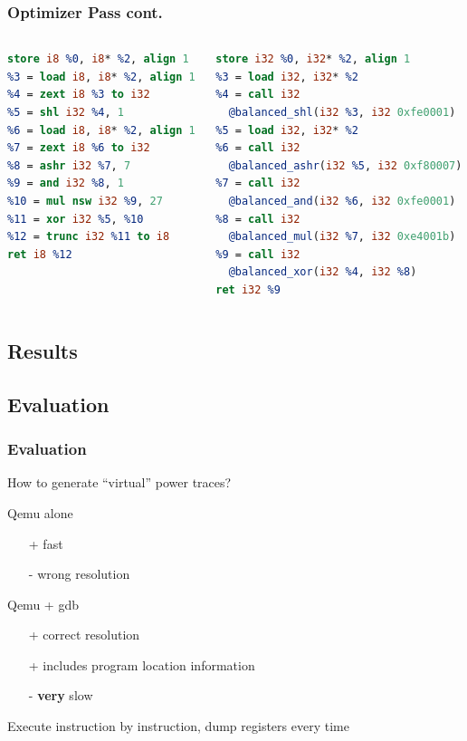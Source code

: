 \documentclass[11pt,t,usepdftitle=false,aspectratio=169]{beamer}
\begin{document}
\begin{frame}[fragile]
  \frametitle{Optimizer Pass cont.}
  \begin{columns}[T]
    \begin{column}{0.4\textwidth}
      \begin{lstlisting}[language=LLVM, basicstyle=\small]
%2 = alloca i8, align 1
store i8 %0, i8* %2, align 1
%3 = load i8, i8* %2, align 1
%4 = zext i8 %3 to i32
%5 = shl i32 %4, 1
%6 = load i8, i8* %2, align 1
%7 = zext i8 %6 to i32
%8 = ashr i32 %7, 7
%9 = and i32 %8, 1
%10 = mul nsw i32 %9, 27
%11 = xor i32 %5, %10
%12 = trunc i32 %11 to i8
ret i8 %12
      \end{lstlisting}
    \end{column}
    \vrule
    \hfill
    \begin{column}{0.48\textwidth}
      \begin{lstlisting}[language=LLVM, basicstyle=\small]
%2 = alloca i32
store i32 %0, i32* %2, align 1
%3 = load i32, i32* %2
%4 = call i32
  @balanced_shl(i32 %3, i32 0xfe0001)
%5 = load i32, i32* %2
%6 = call i32
  @balanced_ashr(i32 %5, i32 0xf80007)
%7 = call i32
  @balanced_and(i32 %6, i32 0xfe0001)
%8 = call i32
  @balanced_mul(i32 %7, i32 0xe4001b)
%9 = call i32
  @balanced_xor(i32 %4, i32 %8)
ret i32 %9
      \end{lstlisting}
    \end{column}
  \end{columns}
\end{frame}

\subsection{Results}


\subsection{Evaluation}
\begin{frame}
  \frametitle{Evaluation}

  How to generate ``virtual'' power traces?
  
  \begin{block}{Qemu alone}
    \begin{itemize}
    \item[+] fast
    \item[-] wrong resolution
    \end{itemize}
  \end{block}

  \begin{alertblock}{Qemu + gdb}
    \begin{itemize}
    \item[+] correct resolution
    \item[+] includes program location information
    \item[-] \textbf{very} slow
    \end{itemize}
    Execute instruction by instruction, dump registers every time
  \end{alertblock}
\end{frame}
\end{document}
